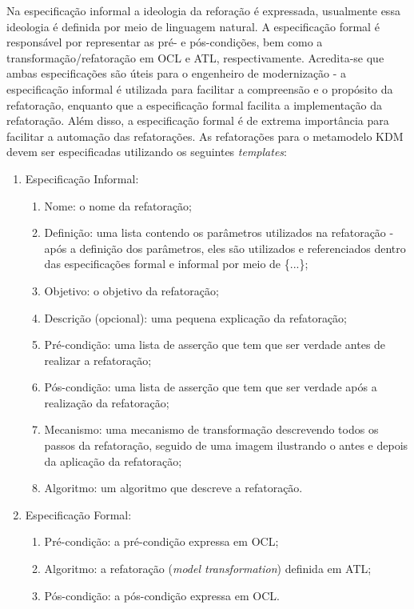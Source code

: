 Na especificação informal a ideologia da reforação é expressada, usualmente essa ideologia é definida por meio de linguagem natural. A especificação formal é responsável por representar as pré- e pós-condições, bem como a transformação/refatoração em OCL e ATL, respectivamente. Acredita-se que ambas especificações são úteis para o engenheiro de modernização - a especificação informal é utilizada para facilitar a compreensão e o propósito da refatoração, enquanto que a especificação formal facilita a implementação da refatoração. Além disso, a especificação formal é de extrema importância para facilitar a automação das refatorações. 
%
%
%
%
As refatorações para o metamodelo KDM devem ser especificadas utilizando os seguintes \textit{templates}:

\begin{enumerate}
	\item Especificação Informal:
		\begin{enumerate}
			\item Nome: o nome da refatoração;
			\item Definição: uma lista contendo os parâmetros utilizados na refatoração - após a definição dos parâmetros, eles são utilizados e referenciados dentro das especificações formal e informal por meio de \{...\};
			\item Objetivo: o objetivo da refatoração;
			\item Descrição (opcional): uma pequena explicação da refatoração;
			\item Pré-condição: uma lista de asserção que tem que ser verdade antes de realizar a refatoração;
			\item Pós-condição: uma lista de asserção que tem que ser verdade após a realização da refatoração;
			\item Mecanismo: uma mecanismo de transformação descrevendo todos os passos da refatoração, seguido de uma imagem ilustrando o antes e depois da aplicação da refatoração;
			\item Algoritmo: um algoritmo que descreve a refatoração.
		\end{enumerate}
	\item Especificação Formal:
		\begin{enumerate}
			\item Pré-condição: a pré-condição expressa em OCL;
			\item Algoritmo: a refatoração (\textit{model transformation}) definida em ATL;
			\item Pós-condição: a pós-condição expressa em OCL.
		\end{enumerate}
\end{enumerate}


